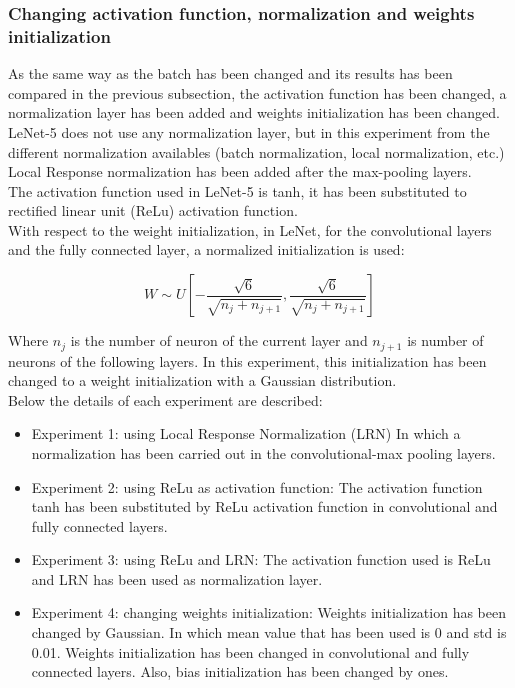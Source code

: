 \subsubsection{Changing activation function, normalization and weights initialization}
As the same way as the batch has been changed and its results has been compared in the previous subsection, the activation function has been changed, a normalization layer has been added and weights initialization has been changed.\\

LeNet-5 does not use any normalization layer, but in this experiment from the different normalization availables (batch normalization, local normalization, etc.) Local Response normalization has been added after the max-pooling layers.\\

The activation function used in LeNet-5 is tanh, it has been substituted to rectified linear unit (ReLu) activation function.\\

With respect to the weight initialization, in LeNet, for the convolutional layers and the fully connected layer,  a normalized initialization \cite{XavierInitialization} is used:

\begin{equation}
  W \sim U [- \frac{\sqrt{6}}{\sqrt{n_{j}+n_{j+1}}},\frac{\sqrt{6}}{\sqrt{n_{j}+n_{j+1}}}]
\end{equation}

Where $n_{j}$ is the number of neuron of the current layer and $n_{j+1}$ is number of neurons of the following layers. In this experiment, this initialization has been changed to a weight initialization with a Gaussian distribution.\\

Below the details of each experiment are described:\\

\begin{itemize}
\item{Experiment 1: using Local Response Normalization (LRN) In which a normalization has been carried out in the convolutional-max pooling layers.}
\item{Experiment 2: using ReLu as activation function:} The activation function tanh has been substituted by ReLu activation function in convolutional and fully connected layers.
\item{Experiment 3: using ReLu and LRN}: The activation function used is ReLu and LRN has been used as  normalization layer.
\item{Experiment 4: changing weights initialization}: Weights initialization has been changed by Gaussian. In which mean value that has been used is 0 and std is 0.01. Weights initialization has been changed in convolutional and fully connected layers. Also, bias initialization has been changed by ones.
\end{itemize}

